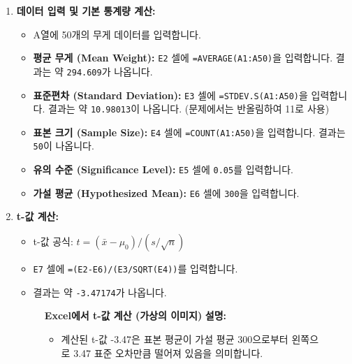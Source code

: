 \documentclass[11pt,a4paper]{book}
\providecommand{\captionof}[2]{\textbf{#2}}
\theoremstyle{definition}
\begin{document}
\begin{enumerate}
    \item \textbf{데이터 입력 및 기본 통계량 계산:}
    \begin{itemize}
        \item A열에 50개의 무게 데이터를 입력합니다.
        \item \textbf{평균 무게 (Mean Weight):} \texttt{E2} 셀에 \texttt{=AVERAGE(A1:A50)}을 입력합니다. 결과는 약 \texttt{294.609}가 나옵니다.
        \item \textbf{표준편차 (Standard Deviation):} \texttt{E3} 셀에 \texttt{=STDEV.S(A1:A50)}을 입력합니다. 결과는 약 \texttt{10.98013}이 나옵니다. (문제에서는 반올림하여 11로 사용)
        \item \textbf{표본 크기 (Sample Size):} \texttt{E4} 셀에 \texttt{=COUNT(A1:A50)}을 입력합니다. 결과는 \texttt{50}이 나옵니다.
        \item \textbf{유의 수준 (Significance Level):} \texttt{E5} 셀에 \texttt{0.05}를 입력합니다.
        \item \textbf{가설 평균 (Hypothesized Mean):} \texttt{E6} 셀에 \texttt{300}을 입력합니다.
    \end{itemize}

    \item \textbf{t-값 계산:}
    \begin{itemize}
        \item t-값 공식: $t = (\bar{x} - \mu_0) / (s / \sqrt{n})$
        \item \texttt{E7} 셀에 \texttt{=(E2-E6)/(E3/SQRT(E4))}를 입력합니다.
        \item 결과는 약 \texttt{-3.47174}가 나옵니다.
    \end{itemize}
    \begin{figure}[h!]
        \centering
        \captionof{figure}{Excel에서 t-값 계산 (가상의 이미지)}
        \label{fig:excel_t_value}
        \vspace{0.5em}
        \textbf{설명:}
        \begin{itemize}
            \item 계산된 t-값 -3.47은 표본 평균이 가설 평균 300으로부터 왼쪽으로 3.47 표준 오차만큼 떨어져 있음을 의미합니다.
        \end{itemize}
    \end{figure}


\end{enumerate}
\end{document}
